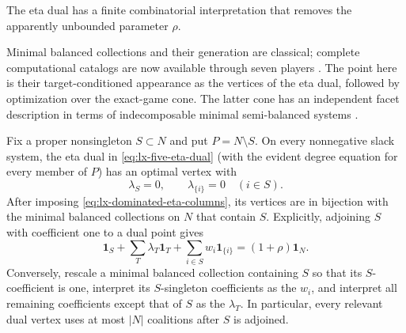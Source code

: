 The eta dual has a finite combinatorial interpretation that removes the
apparently unbounded parameter $\rho$.

Minimal balanced collections and their generation are classical; complete
computational catalogs are now available through seven players
\citep{LaplaceMermoudEtAl2025}.  The point here is their target-conditioned
appearance as the vertices of the eta dual, followed by optimization over the
exact-game cone.  The latter cone has an independent facet description in
terms of indecomposable minimal semi-balanced systems
\citep{StudenyKratochvil2022}.

\begin{lemma}
\label{lem:lx-eta-minimal-balanced}
Fix a proper nonsingleton $S\subset N$ and put $P=N\setminus S$.  On every
nonnegative slack system, the eta dual in \eqref{eq:lx-five-eta-dual} (with
the evident degree equation for every member of $P$) has an optimal vertex
with
\[
 \lambda_S=0,
 \qquad
 \lambda_{\{i\}}=0\quad(i\in S).
 \tag{DV}\label{eq:lx-dominated-eta-columns}
\]
After imposing \eqref{eq:lx-dominated-eta-columns}, its vertices are in
bijection with the minimal balanced collections on $N$ that contain $S$.
Explicitly, adjoining $S$ with coefficient one to a dual point gives
\[
 \mathbf1_S+
 \sum_T\lambda_T\mathbf1_T+
 \sum_{i\in S}w_i\mathbf1_{\{i\}}
   =(1+\rho)\mathbf1_N.
 \tag{MB}\label{eq:lx-eta-balanced-collection}
\]
Conversely, rescale a minimal balanced collection containing $S$ so that its
$S$-coefficient is one, interpret its $S$-singleton coefficients as the
$w_i$, and interpret all remaining coefficients except that of $S$ as the
$\lambda_T$.  In particular, every relevant dual vertex uses at most $|N|$
coalitions after $S$ is adjoined.
\end{lemma}

